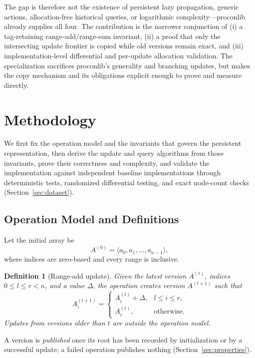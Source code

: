 \documentclass[conference]{IEEEtran}
\newtheorem{definition}{Definition}
\begin{document}
The gap is therefore not the existence of persistent lazy propagation, generic actions,
allocation-free historical queries, or logarithmic complexity---proconlib already supplies all
four. The contribution is the narrower conjunction of (i) a tag-retaining range-add/range-sum
invariant, (ii) a proof that only the intersecting update frontier is copied while old versions
remain exact, and (iii) implementation-level differential and per-update allocation validation.
The specialization sacrifices proconlib's generality and branching updates, but makes the copy
mechanism and its obligations explicit enough to prove and measure directly.

\section{Methodology}
\label{sec:method}

We first fix the operation model and the invariants that govern the persistent representation,
then derive the update and query algorithms from those invariants, prove their correctness and
complexity, and validate the implementation against independent baseline implementations
through deterministic tests, randomized differential testing, and exact node-count checks
(Section~\ref{sec:dataset}).

\subsection{Operation Model and Definitions}
\label{sec:def}

Let the initial array be
\[
A^{(0)} = \langle a_0, a_1, \ldots, a_{n-1} \rangle ,
\]
where indices are zero-based and every range is inclusive.

\begin{definition}[Range-add update]
\label{def:update}
Given the latest version $A^{(t)}$, indices $0 \leq l \leq r < n$, and a value $\Delta$, the
operation creates version $A^{(t+1)}$ such that
\[
A^{(t+1)}_i =
\begin{cases}
A^{(t)}_i + \Delta, & l \leq i \leq r,\\
A^{(t)}_i, & \text{otherwise}.
\end{cases}
\]
Updates from versions older than $t$ are outside the operation model.
\end{definition}

A version is \emph{published} once its root has been recorded by initialization or by a
successful update; a failed operation publishes nothing
(Section~\ref{sec:properties}).
\end{document}
